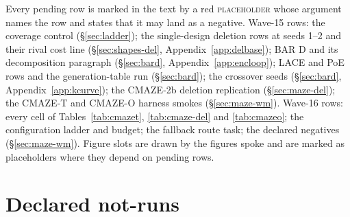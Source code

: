 \documentclass{article} %
\begin{document}
Every pending row is marked in the text by a red \textsc{placeholder} whose argument names the row
and states that it may land as a negative. Wave-15 rows: the coverage control
(\S\ref{sec:ladder}); the single-design deletion rows at seeds 1--2 and their rival cost line
(\S\ref{sec:shapes-del}, Appendix~\ref{app:delbase}); BAR D and its decomposition paragraph
(\S\ref{sec:bard}, Appendix~\ref{app:encloop}); LACE and PoE rows and the generation-table run
(\S\ref{sec:bard}); the crossover seeds (\S\ref{sec:bard}, Appendix~\ref{app:kcurve}); the CMAZE-2b
deletion replication (\S\ref{sec:maze-del}); the CMAZE-T and CMAZE-O harness smokes
(\S\ref{sec:maze-wm}). Wave-16 rows: every cell of Tables~\ref{tab:cmazet}, \ref{tab:cmaze-del} and
\ref{tab:cmazeo}; the configuration ladder and budget; the fallback route task; the declared
negatives (\S\ref{sec:maze-wm}). Figure slots are drawn by the figures spoke and are marked as
placeholders where they depend on pending rows.

\section{Declared not-runs}
\label{app:notrun}
\end{document}
